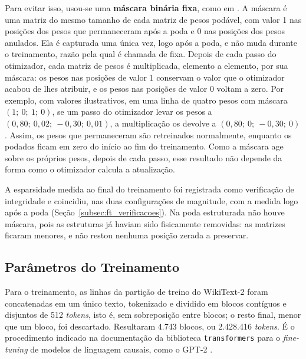 Para evitar isso, usou-se uma \textbf{máscara binária fixa}, como em
. A máscara é uma matriz do mesmo tamanho de cada matriz de pesos
podável, com valor 1 nas posições dos pesos que permaneceram após a poda e 0 nas posições
dos pesos anulados. Ela é capturada uma única vez, logo após a poda, e não muda durante o
treinamento, razão pela qual é chamada de fixa. Depois de cada passo do otimizador, cada
matriz de pesos é multiplicada, elemento a elemento, por sua máscara: os pesos nas posições
de valor 1 conservam o valor que o otimizador acabou de lhes atribuir, e os pesos nas
posições de valor 0 voltam a zero. Por exemplo, com valores ilustrativos, em uma linha de
quatro pesos com máscara $(1;\ 0;\ 1;\ 0)$, se um passo do otimizador levar os pesos a
$(0{,}80;\ 0{,}02;\ -0{,}30;\ 0{,}01)$, a multiplicação os devolve a
$(0{,}80;\ 0;\ -0{,}30;\ 0)$. Assim, os pesos que permaneceram são
retreinados normalmente, enquanto os podados ficam em zero do início ao fim do
treinamento. Como a máscara age sobre os próprios pesos, depois de cada passo, esse
resultado não depende da forma como o otimizador calcula a atualização.

A esparsidade medida ao final do treinamento foi registrada como verificação de
integridade e coincidiu, nas duas configurações de magnitude, com a medida logo após a
poda (Seção~\ref{subsec:ft_verificacoes}). Na poda estruturada não houve máscara, pois as
estruturas já haviam sido fisicamente removidas: as matrizes ficaram menores, e não restou
nenhuma posição zerada a preservar.

\subsection{Parâmetros do Treinamento}\label{subsec:ft_protocolo}

Para o treinamento, as linhas da partição de treino do WikiText-2 foram concatenadas em
um único texto, tokenizado e dividido em blocos contíguos e disjuntos de 512
\textit{tokens}, isto é, sem sobreposição entre blocos; o resto final, menor que um bloco,
foi descartado. Resultaram 4.743 blocos, ou 2.428.416 \textit{tokens}. É o procedimento
indicado na documentação da biblioteca \texttt{transformers} para o \textit{fine-tuning}
de modelos de linguagem causais, como o GPT-2 \cite{HuggingFaceCLM}.

